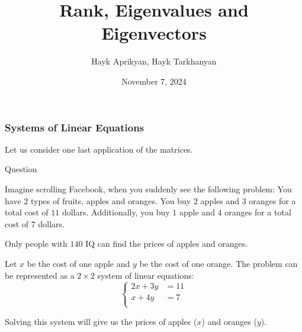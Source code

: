 \documentclass{beamer}
\title[Lecture 4]{Rank, Eigenvalues and Eigenvectors}
\author[Aprikyan, Tarkhanyan]{Hayk Aprikyan, Hayk Tarkhanyan}
\institute[ACA]{Armenian Code Academy}
\date{November 7, 2024}
\begin{document}
\begin{frame}
  \titlepage
\end{frame}





\begin{frame}
  \frametitle{Systems of Linear Equations}

Let us consider one last application of the matrices.
  
  \begin{block}{Question}

    Imagine scrolling Facebook, when you suddenly see the following problem: You have $2$ types of fruits, apples and oranges. You buy $2$ apples and $3$ oranges for a total cost of $11$ dollars. Additionally, you buy $1$ apple and $4$ oranges for a total cost of $7$ dollars. 
    
    Only people with $140$ IQ can find the prices of apples and oranges.
  \end{block}
  \pause
    Let \(x\) be the cost of one apple and \(y\) be the cost of one orange. The problem can be represented as a $2 \times 2$ system of linear equations:
    \[
      \begin{cases}
        2x  +  3y & =  11 \\
        x +  4y & =  7 \\
      \end{cases}
    \]

    Solving this system will give us the prices of apples (\(x\)) and oranges (\(y\)).

\end{frame}
\end{document}
